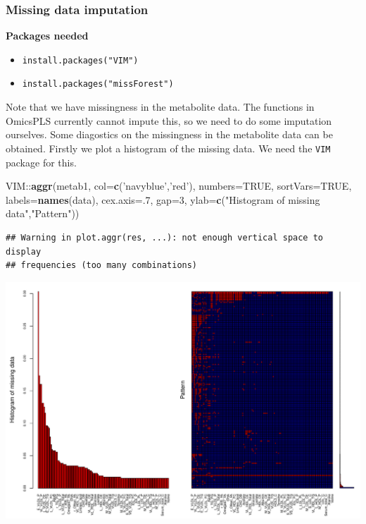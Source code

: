 \documentclass[]{article}
\newenvironment{Shaded}{\begin{snugshade}}{\end{snugshade}}
\newcommand{\KeywordTok}[1]{\textcolor[rgb]{0.13,0.29,0.53}{\textbf{{#1}}}}
\newcommand{\DataTypeTok}[1]{\textcolor[rgb]{0.13,0.29,0.53}{{#1}}}
\newcommand{\DecValTok}[1]{\textcolor[rgb]{0.00,0.00,0.81}{{#1}}}
\newcommand{\StringTok}[1]{\textcolor[rgb]{0.31,0.60,0.02}{{#1}}}
\newcommand{\OtherTok}[1]{\textcolor[rgb]{0.56,0.35,0.01}{{#1}}}
\newcommand{\NormalTok}[1]{{#1}}
\providecommand{\tightlist}{%
  \setlength{\itemsep}{0pt}\setlength{\parskip}{0pt}}
\begin{document}
\subsubsection{Missing data imputation}\label{missing-data-imputation}

\textbf{Packages needed}

\begin{itemize}
\tightlist
\item
  \texttt{install.packages("VIM")}
\item
  \texttt{install.packages("missForest")}
\end{itemize}

Note that we have missingness in the metabolite data. The functions in
OmicsPLS currently cannot impute this, so we need to do some imputation
ourselves. Some diagostics on the missingness in the metabolite data can
be obtained. Firstly we plot a histogram of the missing data. We need
the \texttt{VIM} package for this.

\begin{Shaded}
\begin{Highlighting}[]
\NormalTok{VIM::}\KeywordTok{aggr}\NormalTok{(metab1, }\DataTypeTok{col=}\KeywordTok{c}\NormalTok{(}\StringTok{'navyblue'}\NormalTok{,}\StringTok{'red'}\NormalTok{), }\DataTypeTok{numbers=}\OtherTok{TRUE}\NormalTok{, }\DataTypeTok{sortVars=}\OtherTok{TRUE}\NormalTok{, }
     \DataTypeTok{labels=}\KeywordTok{names}\NormalTok{(data), }\DataTypeTok{cex.axis=}\NormalTok{.}\DecValTok{7}\NormalTok{, }\DataTypeTok{gap=}\DecValTok{3}\NormalTok{, }\DataTypeTok{ylab=}\KeywordTok{c}\NormalTok{(}\StringTok{"Histogram of missing data"}\NormalTok{,}\StringTok{"Pattern"}\NormalTok{))}
\end{Highlighting}
\end{Shaded}

\begin{verbatim}
## Warning in plot.aggr(res, ...): not enough vertical space to display
## frequencies (too many combinations)
\end{verbatim}

\includegraphics{Figs/Visualize missingness-1.pdf}
\end{document}

